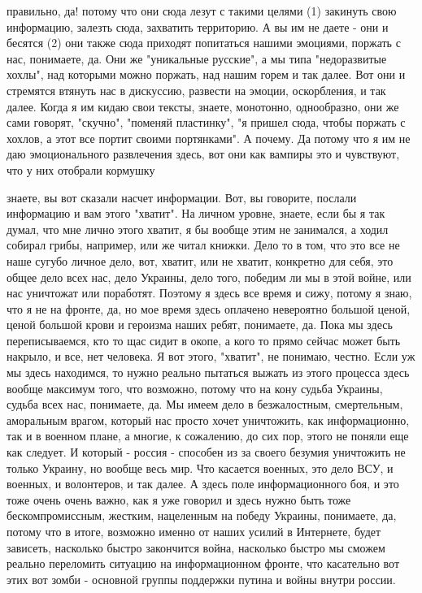 правильно, да! потому что они сюда лезут с такими целями (1) закинуть свою
информацию, залезть сюда, захватить территорию. А вы им не даете - они и
бесятся (2) они также сюда приходят попитаться нашими эмоциями, поржать с нас,
понимаете, да. Они же "уникальные русские",  а мы типа "недоразвитые хохлы",
над которыми можно поржать, над нашим горем и так далее. Вот они и стремятся
втянуть нас в дискуссию, развести на эмоции, оскорбления, и так далее. Когда я
им кидаю свои тексты, знаете, монотонно, однообразно, они же сами говорят,
"скучно", "поменяй пластинку", "я пришел сюда, чтобы поржать с хохлов, а этот
все портит своими портянками". А почему. Да потому что я им не даю
эмоционального развлечения здесь, вот они как вампиры это и чувствуют, что у
них отобрали кормушку

знаете, вы вот сказали насчет информации. Вот, вы говорите, послали информацию
и вам этого "хватит". На личном уровне, знаете, если бы я так думал, что мне
лично этого хватит, я бы вообще этим не занимался, а ходил собирал грибы,
например, или же читал книжки. Дело то в том, что это все не наше сугубо личное
дело, вот, хватит, или не хватит, конкретно для себя, это общее дело всех нас,
дело Украины, дело того, победим ли мы в этой войне, или нас уничтожат или
поработят. Поэтому я здесь все время и сижу, потому я знаю, что я не на фронте,
да, но мое время здесь оплачено невероятно большой ценой, ценой большой крови и
героизма наших ребят, понимаете, да. Пока мы здесь переписываемся, кто то щас
сидит в окопе, а кого то прямо сейчас может быть накрыло, и все, нет человека.
Я вот этого, "хватит", не понимаю, честно. Если уж мы здесь находимся, то нужно
реально пытаться выжать из этого процесса здесь вообще максимум того, что
возможно, потому что на кону судьба Украины, судьба всех нас, понимаете, да. Мы
имеем дело в безжалостным, смертельным, аморальным врагом, который нас просто
хочет уничтожить, как информационно, так и в военном плане, а многие, к
сожалению, до сих пор, этого не поняли еще как следует. И который - россия -
способен из за своего безумия уничтожить не только Украину, но вообще весь мир.
Что касается военных, это дело ВСУ, и военных, и волонтеров, и так далее. А
здесь поле информационного боя, и это тоже очень очень важно, как я уже говорил
и здесь нужно быть тоже бескомпромиссным, жестким, нацеленным на победу
Украины, понимаете, да, потому что в итоге, возможно именно от наших усилий в
Интернете, будет зависеть, насколько быстро закончится война, насколько быстро
мы сможем реально переломить ситуацию на информационном фронте, что касательно
вот этих вот зомби - основной группы поддержки путина и войны внутри россии.

